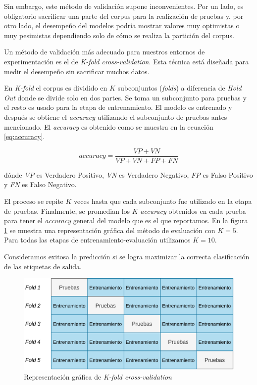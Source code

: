 \documentclass[letterpaper,12pt,oneside]{book}
\theoremstyle{definition}
\begin{document}
Sin embargo, este método de validación supone inconvenientes. Por un lado, es obligatorio sacrificar una parte del corpus para la realización de pruebas y, por otro lado, el desempeño del modelos podría mostrar valores muy optimistas o muy pesimistas dependiendo solo de cómo se realiza la partición del corpus.

Un método de validación más adecuado para nuestros entornos de experimentación es el de \textit{K-fold cross-validation}. Esta técnica está diseñada para medir el desempeño sin sacrificar muchos datos. 

En \textit{K-fold} el corpus es dividido en $K$ subconjuntos (\textit{folds}) a diferencia de \textit{Hold Out} donde se divide solo en dos partes. Se toma un subconjunto para pruebas y el resto es usado para la etapa de entrenamiento. El modelo es entrenado y después se obtiene el \textit{accuracy} utilizando el subconjunto de pruebas antes mencionado. El \textit{accuracy} es obtenido como se muestra en la ecuación \ref{eq:accuracy}.

\begin{equation}\label{eq:accuracy}
    accuracy = \frac{VP + VN}{VP + VN + FP + FN}
\end{equation}

dónde \textit{VP} es Verdadero Positivo, \textit{VN} es Verdadero Negativo, \textit{FP} es Falso Positivo y \textit{FN} es Falso Negativo.

El proceso se repite $K$ veces hasta que cada subconjunto fue utilizado en la etapa de pruebas. Finalmente, se promedian los $K$ \textit{accuracy} obtenidos en cada prueba para tener el \textit{accuracy} general del modelo que es el que reportamos. En la figura \ref{fig:k-fold} se muestra una representación gráfica del método de evaluación con $K = 5$. Para todas las etapas de entrenamiento-evaluación utilizamos $K = 10$.

Consideramos exitosa la predicción si se logra maximizar la correcta clasificación de las etiquetas de salida.

\begin{figure}[ht]
    \centering
    \includegraphics[scale=0.8]{img/kfold.png}
    \caption{Representación gráfica de \textit{K-fold cross-validation}}
    \label{fig:k-fold}
\end{figure}
\end{document}
